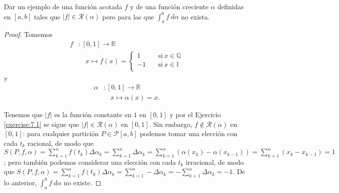 \begin{exercise}

Dar un ejemplo de una función acotada $f$ y de una función creciente $\alpha$ definidas en $\left[a,b\right]$ tales que $|f|\in\mathcal{R}\left(\alpha\right)$ pero para las que $\int_a^bf\ d\alpha$ no exista.

\end{exercise}

\renewcommand*{\proofname}{Solución}
\begin{proof}

Tomemos
\begin{align*}
f&:\left[0,1\right]\rightarrow \mathbb{R}\\
&\quad x\longmapsto f(x)=\begin{cases}
          1 \quad &\text{si}\ x \in \mathbb{Q} \\
          -1 \quad &\text{si}\ x \in \mathbb{I} \\
     \end{cases}
\end{align*}
y
\begin{align*}
\alpha&:\left[0,1\right]\rightarrow \mathbb{R}\\
&\quad x\longmapsto \alpha(x)=x.
\end{align*}

Tenemos que $|f|$ es la función constante en $1$ en $\left[0,1\right]$ y por el Ejercicio \ref{exercise:7.1} se sigue que $|f|\in\mathcal{R}\left(\alpha\right)$ en $\left[0,1\right]$. Sin embargo, $f\notin\mathcal{R}\left(\alpha\right)$ en $\left[0,1\right]$: para cualquier partición $P\in\mathcal{P}\left[a,b\right]$ podemos tomar una elección con cada $t_k$ racional, de modo que $S\left(P,f,\alpha\right)=\sum_{k=1}^{n}f\left(t_k\right)\Delta \alpha_k = \sum_{k=1}^{n}\Delta \alpha_k=\sum_{k=1}^{n}\left(\alpha\left(x_k\right)-\alpha\left(x_{k-1}\right)\right)=\sum_{k=1}^{n}\left(x_k-x_{k-1}\right)=1$; pero también podemos considerar una elección con cada $t_k$ irracional, de modo que $S\left(P,f,\alpha\right)=\sum_{k=1}^{n}f\left(t_k\right)\Delta \alpha_k = \sum_{k=1}^{n}-\Delta \alpha_k=-\sum_{k=1}^{n}\Delta \alpha_k=-1$. De lo anterior, $\int_a^b f\ d\alpha$ no existe.

\end{proof}
\renewcommand*{\proofname}{Prueba}

